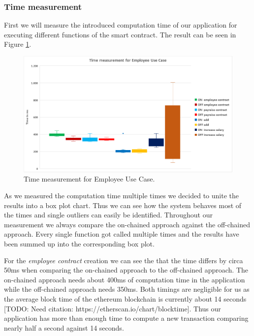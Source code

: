 \subsubsection{Time measurement}
First we will measure the introduced computation time of our application for executing different functions of the smart contract. The result can be seen in Figure \ref{fig:05_time}.

\begin{figure}[t]%
\centering
\includegraphics[width=1.0\textwidth]{images/05_time.png}
\caption{\label{fig:05_time}Time measurement for Employee Use Case.}
\end{figure}

As we measured the computation time multiple times we decided to unite the results into a box plot chart. Thus we can see how the system behaves most of the times and single outliers can easily be identified. Throughout our measurement we always compare the on-chained approach against the off-chained approach. Every single function got called multiple times and the results have been summed up into the corresponding box plot.

For the \textit{employee contract} creation we can see the that the time differs by circa 50ms when comparing the on-chained approach to the off-chained approach. The on-chained approach needs about 400ms of computation time in the application while the off-chained approach needs 350ms. Both timings are negligible for us as the average block time of the ethereum blockchain is currently about 14 seconds [TODO: Need citation: https://etherscan.io/chart/blocktime]. Thus our application has more than enough time to compute a new transaction comparing nearly half a second against 14 seconds.

